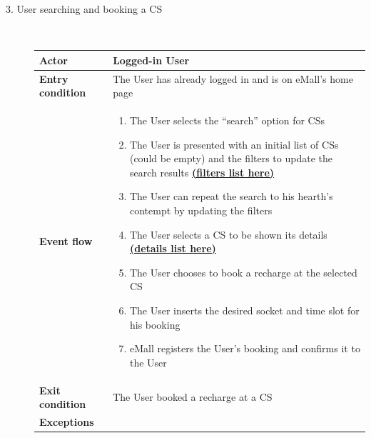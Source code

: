\documentclass[11pt]{article}
\begin{document}
\begin{description}
    \item [3. User searching and booking a CS] \hfill \\
    \begin{table}[H]
        \centering
        \setlength{\tabcolsep}{18pt}
        \renewcommand{\arraystretch}{1.4}
        \begin{tabularx}{\textwidth}{|>{\hsize=0.5\hsize}X|>{\hsize=1.5\hsize}X|}
            \hline
            \textbf{Actor} & Logged-in User \\
            \hline
            \textbf{Entry condition} & The User has already logged in and is on eMall's home page \\
            \hline
            \textbf{Event flow} & 
                \begin{minipage}[t]{\hsize}
                \begin{enumerate}[topsep=0pt, leftmargin=*]
                    \item The User selects the “search” option for CSs  
                    \item The User is presented with an initial list of CSs (could be empty) and the filters to update the search results \hyperref[scenario:lookingForCS]{\textbf{(filters list here)}}
                    \item The User can repeat the search to his hearth's contempt by updating the filters
                    \item The User selects a CS to be shown its details \hyperref[scenario:lookingForCS]{\textbf{(details list here)}}
                    \item The User chooses to book a recharge at the selected CS
                    \item The User inserts the desired socket and time slot for his booking
                    \item eMall registers the User's booking and confirms it to the User
                \end{enumerate}
                \end{minipage}
                \vspace{6pt}
            \\
            \hline
            \textbf{Exit condition} & The User booked a recharge at a CS \\
            \hline
            \textbf{Exceptions} & 
                \begin{minipage}[t]{\hsize}

\end{minipage}
\end{tabularx}
\end{table}
\end{description}
\end{document}
